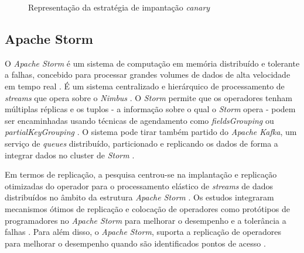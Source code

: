 \begin{figure}[H]
    \centering
    \qquad
    \caption{Representação da estratégia de impantação \textit{canary}}%
    \label{fig:blue-green}%
\end{figure}

\subsection{Apache Storm}

O \textit{Apache Storm} é um sistema de computação em memória distribuído e tolerante a falhas, 
concebido para processar grandes volumes de dados de alta velocidade em tempo real \cite{storm2017}. 
É um sistema centralizado e hierárquico de processamento de \textit{streams} que opera sobre o 
\textit{Nimbus} \cite{storm2015}. O \textit{Storm} permite que os operadores tenham múltiplas 
réplicas e os tuplos - a informação sobre o qual o \textit{Storm} opera - podem ser encaminhadas 
usando técnicas de agendamento como \textit{fieldsGrouping} ou \textit{partialKeyGrouping}
\cite{storm2018}. O sistema pode tirar também partido do \textit{Apache Kafka}, um serviço de 
\textit{queues} distribuído, particionado e replicando os dados de forma a integrar dados no 
\gls{cluster} de \textit{Storm} \cite{storm2018b}.


Em termos de replicação, a pesquisa centrou-se na implantação e replicação otimizadas do 
operador para o processamento elástico de \textit{streams} de dados distribuídos no âmbito 
da estrutura \textit{Apache Storm} \cite{storm2017b}. Os estudos integraram mecanismos ótimos de
replicação e colocação de operadores como protótipos de programadores no \textit{Apache Storm} para
melhorar o desempenho e a tolerância a falhas \cite{storm2017c}. Para além disso, o 
\textit{Apache Storm}, suporta a replicação de operadores para melhorar o desempenho quando são 
identificados pontos de acesso \cite{storm2018c}.

